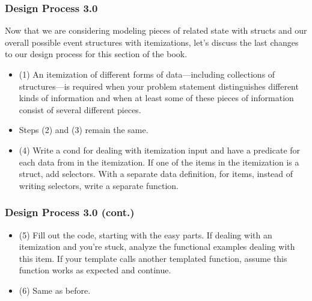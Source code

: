 \documentclass{beamer}
\begin{document}
\begin{frame}
  \frametitle{Design Process 3.0}
  Now that we are considering modeling pieces of related state with structs
  and our overall possible event structures with itemizations, let's
  discuss the last changes to our design process for this section of the book.
  \begin{itemize}
  \item<2-> (1) An itemization of different forms of data—including collections of structures—is required when your problem statement distinguishes different kinds of information and when at least some of these pieces of information consist of several different pieces.
  \item<3-> Steps (2) and (3) remain the same.
  \item<4-> (4) Write a cond for dealing with itemization input and have a predicate
    for each data from in the itemization. If one of the items in the itemization
    is a struct, add selectors. With a separate data definition, for items,
    instead of writing selectors, write a separate function.
  \end{itemize}
\end{frame}

\begin{frame}
  \frametitle{Design Process 3.0 (cont.)}
  \begin{itemize}
  \item<1-> (5) Fill out the code, starting with the easy parts. If dealing
    with an itemization and you're stuck, analyze the functional examples
    dealing with this item. If your template calls another templated function,
    assume this function works as expected and continue.
    \item<2-> (6) Same as before.
  \end{itemize}
\end{frame}

\end{document}
